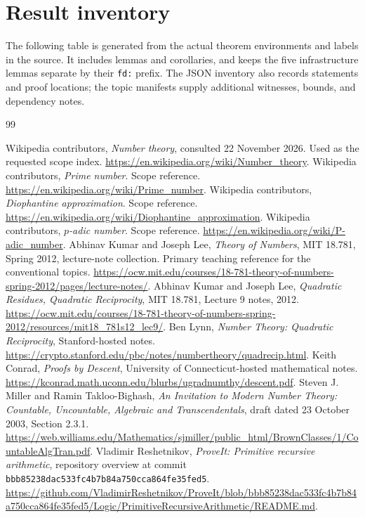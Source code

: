 \documentclass[11pt,letterpaper]{article}
\theoremstyle{definition}
\theoremstyle{remark}
\begin{document}
\section{Result inventory}
The following table is generated from the actual theorem environments and labels in the source. It includes lemmas and corollaries, and keeps the five infrastructure lemmas separate by their \texttt{fd:} prefix. The JSON inventory also records statements and proof locations; the topic manifests supply additional witnesses, bounds, and dependency notes.

\clearpage

\clearpage
\begin{thebibliography}{99}
 Wikipedia contributors, \emph{Number theory}, consulted 22 November 2026. Used as the requested scope index. \url{https://en.wikipedia.org/wiki/Number_theory}.
 Wikipedia contributors, \emph{Prime number}. Scope reference. \url{https://en.wikipedia.org/wiki/Prime_number}.
 Wikipedia contributors, \emph{Diophantine approximation}. Scope reference. \url{https://en.wikipedia.org/wiki/Diophantine_approximation}.
 Wikipedia contributors, \emph{$p$-adic number}. Scope reference. \url{https://en.wikipedia.org/wiki/P-adic_number}.
 Abhinav Kumar and Joseph Lee, \emph{Theory of Numbers}, MIT 18.781, Spring 2012, lecture-note collection. Primary teaching reference for the conventional topics. \url{https://ocw.mit.edu/courses/18-781-theory-of-numbers-spring-2012/pages/lecture-notes/}.
 Abhinav Kumar and Joseph Lee, \emph{Quadratic Residues, Quadratic Reciprocity}, MIT 18.781, Lecture 9 notes, 2012. \url{https://ocw.mit.edu/courses/18-781-theory-of-numbers-spring-2012/resources/mit18_781s12_lec9/}.
 Ben Lynn, \emph{Number Theory: Quadratic Reciprocity}, Stanford-hosted notes. \url{https://crypto.stanford.edu/pbc/notes/numbertheory/quadrecip.html}.
 Keith Conrad, \emph{Proofs by Descent}, University of Connecticut-hosted mathematical notes. \url{https://kconrad.math.uconn.edu/blurbs/ugradnumthy/descent.pdf}.
 Steven J. Miller and Ramin Takloo-Bighash, \emph{An Invitation to Modern Number Theory: Countable, Uncountable, Algebraic and Transcendentals}, draft dated 23 October 2003, Section 2.3.1. \url{https://web.williams.edu/Mathematics/sjmiller/public_html/BrownClasses/1/CountableAlgTran.pdf}.
 Vladimir Reshetnikov, \emph{ProveIt: Primitive recursive arithmetic}, repository overview at commit \texttt{bbb85238dac533fc4b7b84a750cca864fe35fed5}. \url{https://github.com/VladimirReshetnikov/ProveIt/blob/bbb85238dac533fc4b7b84a750cca864fe35fed5/Logic/PrimitiveRecursiveArithmetic/README.md}.

\end{thebibliography}
\end{document}
